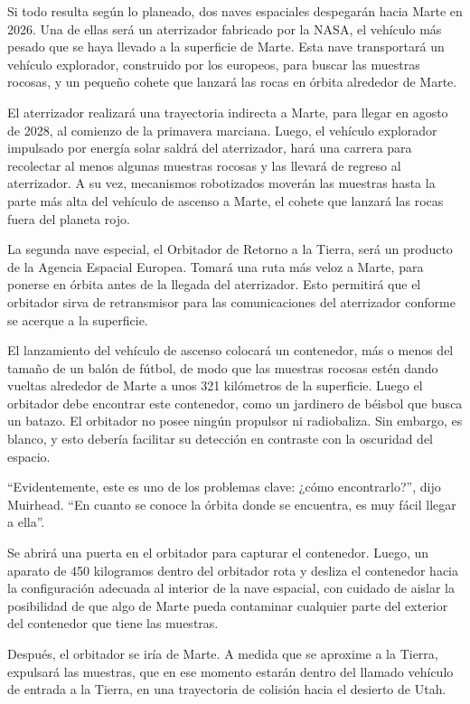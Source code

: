 Si todo resulta según lo planeado, dos naves espaciales despegarán hacia
Marte en 2026. Una de ellas será un aterrizador fabricado por la NASA,
el vehículo más pesado que se haya llevado a la superficie de Marte.
Esta nave transportará un vehículo explorador, construido por los
europeos, para buscar las muestras rocosas, y un pequeño cohete que
lanzará las rocas en órbita alrededor de Marte.

El aterrizador realizará una trayectoria indirecta a Marte, para llegar
en agosto de 2028, al comienzo de la primavera marciana. Luego, el
vehículo explorador impulsado por energía solar saldrá del aterrizador,
hará una carrera para recolectar al menos algunas muestras rocosas y las
llevará de regreso al aterrizador. A su vez, mecanismos robotizados
moverán las muestras hasta la parte más alta del vehículo de ascenso a
Marte, el cohete que lanzará las rocas fuera del planeta rojo.

La segunda nave especial, el Orbitador de Retorno a la Tierra, será un
producto de la Agencia Espacial Europea. Tomará una ruta más veloz a
Marte, para ponerse en órbita antes de la llegada del aterrizador. Esto
permitirá que el orbitador sirva de retransmisor para las comunicaciones
del aterrizador conforme se acerque a la superficie.

El lanzamiento del vehículo de ascenso colocará un contenedor, más o
menos del tamaño de un balón de fútbol, de modo que las muestras rocosas
estén dando vueltas alrededor de Marte a unos 321 kilómetros de la
superficie. Luego el orbitador debe encontrar este contenedor, como un
jardinero de béisbol que busca un batazo. El orbitador no posee ningún
propulsor ni radiobaliza. Sin embargo, es blanco, y esto debería
facilitar su detección en contraste con la oscuridad del espacio.

``Evidentemente, este es uno de los problemas clave: ¿cómo
encontrarlo?'', dijo Muirhead. ``En cuanto se conoce la órbita donde se
encuentra, es muy fácil llegar a ella''.

Se abrirá una puerta en el orbitador para capturar el contenedor. Luego,
un aparato de 450 kilogramos dentro del orbitador rota y desliza el
contenedor hacia la configuración adecuada al interior de la nave
espacial, con cuidado de aislar la posibilidad de que algo de Marte
pueda contaminar cualquier parte del exterior del contenedor que tiene
las muestras.

Después, el orbitador se iría de Marte. A medida que se aproxime a la
Tierra, expulsará las muestras, que en ese momento estarán dentro del
llamado vehículo de entrada a la Tierra, en una trayectoria de colisión
hacia el desierto de Utah.

